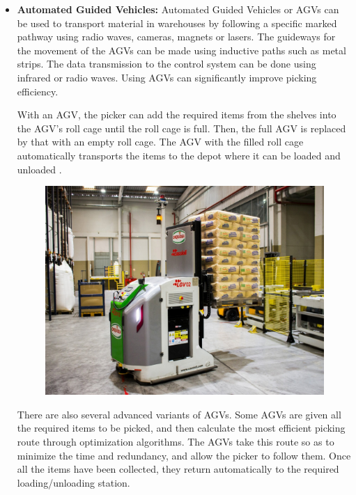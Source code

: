 \documentclass{report}
\begin{document}
\begin{itemize}
    \item {\bfseries Automated Guided Vehicles:} 
    Automated Guided Vehicles or AGVs can be used to transport material in warehouses by following a specific marked pathway using radio waves, cameras, magnets or lasers. The guideways for the movement of the AGVs can be made using inductive paths such as metal strips. The data transmission to the control system can be done using infrared or radio waves. Using AGVs can significantly improve picking efficiency.
    
    With an AGV, the picker can add the required items from the shelves into the AGV's roll cage until the roll cage is full. Then, the full AGV is replaced by that with an empty roll cage. The AGV with the filled roll cage automatically transports the items to the depot where it can be loaded and unloaded \cite{main_paper}. 
    
    \begin{figure}[H]
    
    \centering
    \includegraphics[scale=0.2]{agv.jpg}
    \caption{}
    
    \end{figure}
    
    There are also several advanced variants of AGVs. Some AGVs are given all the required items to be picked, and then calculate the most efficient picking route through optimization algorithms. The AGVs take this route so as to minimize the time and redundancy, and allow the picker to follow them. Once all the items have been collected, they return automatically to the required loading/unloading station.
    

\end{itemize}
\end{document}
